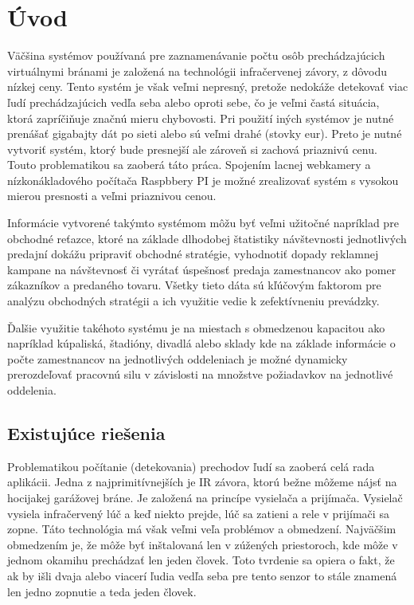 
\chapter{Úvod}
Väčšina systémov používaná pre zaznamenávanie počtu osôb prechádzajúcich virtuálnymi bránami  je založená na technológii infračervenej závory, z dôvodu nízkej ceny. Tento systém je však veľmi nepresný, pretože nedokáže detekovať viac ľudí prechádzajúcich vedľa seba alebo oproti sebe, čo je veľmi častá situácia, ktorá zapríčiňuje značnú mieru chybovosti. Pri použití iných systémov je nutné prenášať gigabajty dát po sieti alebo sú veľmi drahé (stovky eur).  Preto je nutné vytvoriť systém, ktorý bude presnejší ale zároveň si zachová priaznivú cenu. Touto problematikou sa zaoberá táto práca. Spojením lacnej webkamery a nízkonákladového počítača Raspbbery PI je možné zrealizovať systém s vysokou mierou presnosti a veľmi priaznivou cenou.
    
Informácie vytvorené takýmto systémom môžu byť veľmi užitočné napríklad pre obchodné reťazce, ktoré na základe dlhodobej štatistiky návštevnosti jednotlivých predajní dokážu pripraviť obchodné stratégie, vyhodnotiť dopady reklamnej kampane na návštevnosť či vyrátať úspešnosť predaja zamestnancov ako pomer zákazníkov a predaného tovaru. Všetky tieto dáta sú kľúčovým faktorom pre analýzu obchodných stratégii a ich využitie vedie k zefektívneniu prevádzky.
    
Ďalšie využitie takéhoto systému je na miestach s obmedzenou kapacitou ako napríklad kúpaliská, štadióny, divadlá alebo sklady kde na základe informácie o počte zamestnancov na jednotlivých oddeleniach je možné dynamicky prerozdeľovať pracovnú silu v závislosti na množstve požiadavkov na jednotlivé oddelenia. 



\section{Existujúce riešenia}
Problematikou počítanie (detekovania) prechodov ľudí sa zaoberá celá rada aplikácii.  
Jedna z najprimitívnejších je IR závora, ktorú bežne môžeme nájsť na hocijakej garážovej bráne. Je založená na princípe vysielača a prijímača. Vysielač vysiela infračervený lúč a keď niekto prejde, lúč sa zatieni a rele v prijímači sa zopne. Táto technológia má však veľmi veľa problémov a obmedzení. Najväčšim obmedzením je, že môže byť inštalovaná len v zúžených priestoroch, kde môže v jednom okamihu prechádzať len jeden človek. Toto tvrdenie sa opiera o fakt, že ak by išli dvaja alebo viacerí ľudia vedľa seba pre tento senzor to stále znamená len jedno zopnutie a teda jeden človek.

